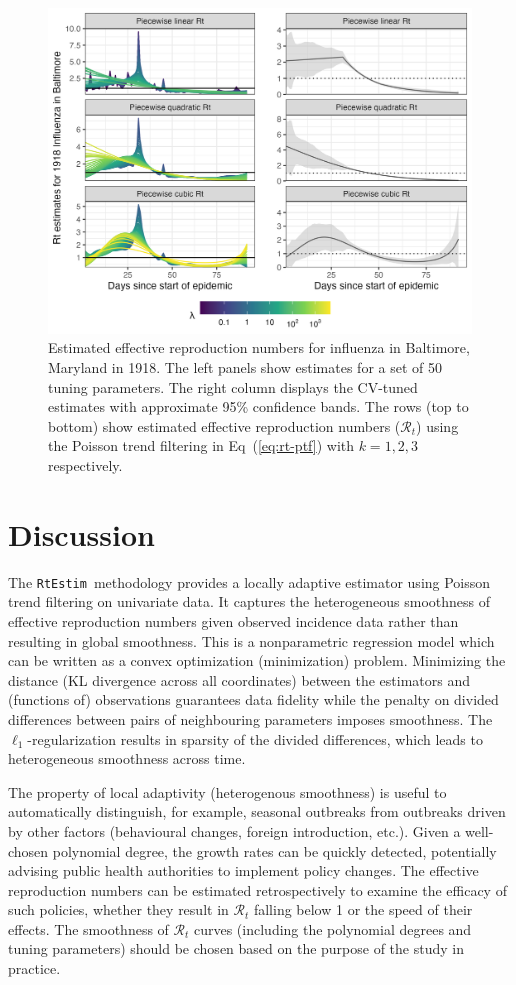 \documentclass[10pt,letterpaper]{article}
\def\RtEstim{\texttt{RtEstim}}
\def\calR{\mathcal{R}}
\renewcommand{\eqref}[1]{Eq~(\ref{#1})}
\begin{document}
\begin{figure}[!ht]
  \centering
  \includegraphics[width=0.9\linewidth]{fig/flu_full_res.png}
  \caption{Estimated effective reproduction numbers for influenza in Baltimore,
  Maryland in 1918. The left panels show estimates for a set of 50 tuning
  parameters. The right column displays the CV-tuned estimates with approximate
  95\% confidence bands. The rows (top to bottom) show estimated effective reproduction
  numbers ($\calR_t$) using the Poisson trend filtering in \eqref{eq:rt-ptf}
  with $k=1,2,3$ respectively.} 
  \label{fig:flu-res}
\end{figure} 


\section{Discussion}
\label{sec:disc}

The \RtEstim\ methodology provides a locally adaptive estimator using Poisson
trend filtering on univariate data. It captures the heterogeneous smoothness of
effective reproduction numbers given observed incidence data rather than
resulting in global smoothness. This is a nonparametric regression model which
can be written as a convex optimization (minimization) problem. Minimizing the
distance (KL divergence across all coordinates) between the estimators and
(functions of) observations guarantees data fidelity while the penalty on divided
differences between pairs of neighbouring parameters imposes smoothness. The
$\ell_1$-regularization results in sparsity of the divided differences, which
leads to heterogeneous smoothness across time. 


The property of local adaptivity (heterogenous smoothness) is useful to
automatically distinguish, for example, seasonal outbreaks from outbreaks driven
by other factors (behavioural changes, foreign introduction, etc.). Given a
well-chosen polynomial degree, the growth rates can be quickly detected, 
potentially advising public health authorities to implement policy changes. The effective
reproduction numbers can be estimated retrospectively to examine the efficacy of
such policies, whether they result in $\calR_t$ falling below 1 or the speed of
their effects. The smoothness of $\calR_t$ curves (including the polynomial 
degrees and tuning parameters) should be chosen based on the purpose of the 
study in practice. 
\end{document}
